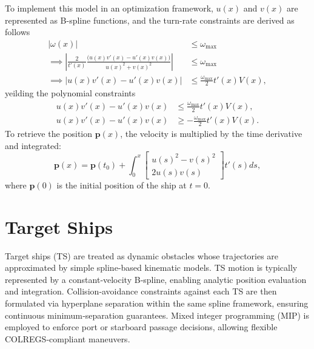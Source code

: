 To implement this model in an optimization framework, $u(x)$ and $v(x)$ are represented as B-spline functions, and the turn-rate constraints are derived as follows
\begin{equation}
    \begin{aligned}
        |\omega(x)| &\le \omega_{\max} \\
        \implies \left|\frac{2}{t'(x)}\frac{\big(u(x)v'(x) - u'(x)v(x)\big)}{u(x)^2 + v(x)^2}\right| &\le \omega_{\max} \\
        \implies \left|u(x)v'(x) - u'(x)v(x)\right| &\le \frac{\omega_{\max}}{2}t'(x)V(x),
    \end{aligned}
\end{equation}
yeilding the polynomial constraints
\begin{subequations}\label{eq:dubins-ph-turn-rate}
    \begin{align}
        u(x)v'(x) - u'(x)v(x) &\le \frac{\omega_{\max}}{2}t'(x)V(x), \\
        u(x)v'(x) - u'(x)v(x) &\ge -\frac{\omega_{\max}}{2}t'(x)V(x).
    \end{align}
\end{subequations}
To retrieve the position $\mathbf{p}(x)$, the velocity is multiplied by the time derivative and integrated:
\begin{equation}\label{eq:dubins-ph-position}
    \mathbf{p}(x) = \mathbf p(t_0) 
    + \int_0^x \begin{bmatrix} 
        u(s)^2-v(s)^2 \\ 2 u(s)v(s)
    \end{bmatrix} t'(s) ds,
\end{equation}
where $\mathbf p(0)$ is the initial position of the ship at $t=0$.

\section{Target Ships}
Target ships (TS) are treated as dynamic obstacles whose trajectories are approximated by simple spline‐based kinematic models. TS motion is typically represented by a constant‐velocity B‐spline, enabling analytic position evaluation and integration. Collision‐avoidance constraints against each TS are then formulated via hyperplane separation within the same spline framework, ensuring continuous minimum‐separation guarantees. Mixed integer programming (MIP) is employed to enforce port or starboard passage decisions, allowing flexible COLREGS‐compliant maneuvers.

